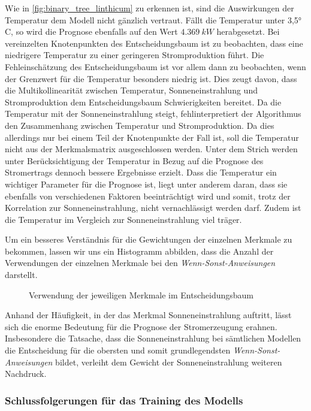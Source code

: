 \documentclass[12pt, a4paper]{article}
\begin{document}
Wie in \autoref{fig:binary_tree_linthicum} zu erkennen ist, sind die Auswirkungen der Temperatur dem Modell nicht gänzlich vertraut. Fällt die Temperatur unter 3,5° C, so wird die Prognose ebenfalls auf den Wert $4.369\ kW$ herabgesetzt. Bei vereinzelten Knotenpunkten des Entscheidungsbaum ist zu beobachten, dass eine niedrigere Temperatur zu einer geringeren Stromproduktion führt. Die Fehleinschätzung des Entscheidungsbaum ist vor allem dann zu beobachten, wenn der Grenzwert für die Temperatur besonders niedrig ist. Dies zeugt davon, dass die Multikollinearität zwischen Temperatur, Sonneneinstrahlung und Stromproduktion dem Entscheidungsbaum Schwierigkeiten bereitet. Da die Temperatur mit der Sonneneinstrahlung steigt, fehlinterpretiert der Algorithmus den Zusammenhang zwischen Temperatur und Stromproduktion. Da dies allerdings nur bei einem Teil der Knotenpunkte der Fall ist, soll die Temperatur nicht aus der Merkmalsmatrix ausgeschlossen werden. Unter dem Strich werden unter Berücksichtigung der Temperatur in Bezug auf die Prognose des Stromertrags dennoch bessere Ergebnisse erzielt. Dass die Temperatur ein wichtiger Parameter für die Prognose ist, liegt unter anderem daran, dass sie ebenfalls von verschiedenen Faktoren beeinträchtigt wird und somit, trotz der Korrelation zur Sonneneinstrahlung, nicht vernachlässigt werden darf. Zudem ist die Temperatur im Vergleich zur Sonneneinstrahlung viel träger.

Um ein besseres Verständnis für die Gewichtungen der einzelnen Merkmale zu bekommen, lassen wir uns ein Histogramm abbilden, dass die Anzahl der Verwendungen der einzelnen Merkmale bei den \textit{Wenn-Sonst-Anweisungen} darstellt.

\begin{figure}[H]
\centering
\fontsize{20}{20}\selectfont
\def\svgwidth{400pt}

\caption{Verwendung der jeweiligen Merkmale im Entscheidungsbaum}
\label{fig:histogram_feature_quantity}
\end{figure}

Anhand der Häufigkeit, in der das Merkmal Sonneneinstrahlung auftritt, lässt sich die enorme Bedeutung für die Prognose der Stromerzeugung erahnen. Insbesondere die Tatsache, dass die Sonneneinstrahlung bei sämtlichen Modellen die Entscheidung für die obersten und somit grundlegendsten \textit{Wenn-Sonst-Anweisungen} bildet, verleiht dem Gewicht der Sonneneinstrahlung weiteren Nachdruck.



\subsubsection{Schlussfolgerungen für das Training des Modells}
\label{subsubsec:conclusion_for_training}
\end{document}
